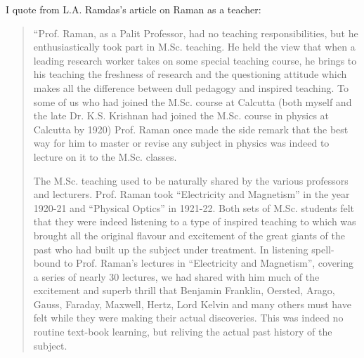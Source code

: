
\noindent
I quote from L.A. Ramdas's article on Raman as a teacher:
\begin{quote}
{\fontsize{10pt}{12pt}\selectfont
``Prof. Raman, as a Palit Professor, had no teaching responsibilities, but he enthusiastically took part in M.Sc. teaching. He held the view that when a leading research worker takes on some special teaching course, he brings to his teaching the freshness of research and the questioning attitude which makes all the difference between dull pedagogy and inspired teaching. To some of us who had joined the M.Sc. course at Calcutta (both myself and the late Dr. K.S. Krishnan had joined the M.Sc. course in physics at Calcutta by 1920) Prof. Raman once made the side remark that the best way for him to master or revise any subject in physics was indeed to lecture on it to the M.Sc. classes.

The M.Sc. teaching used to be naturally shared by the various professors and lecturers. Prof. Raman took ``Electricity and
Magnetism'' in the year 1920-21 and ``Physical Optics'' in 1921-22. Both sets of M.Sc. students felt that they were indeed
listening to a type of inspired teaching to which was brought all the original flavour and excitement of the great giants of the past who had built up the subject under treatment. In listening spell-bound to Prof. Raman's lectures in ``Electricity and Magnetism'', covering a series of nearly 30 lectures, we had shared with him much of the excitement and superb thrill that Benjamin Franklin, Oersted, Arago, Gauss, Faraday, Maxwell, Hertz, Lord Kelvin and many others must have felt while they were making their actual discoveries. This was indeed no routine text-book learning, but reliving the actual past history of the subject.

\newpage

}
\end{quote}
